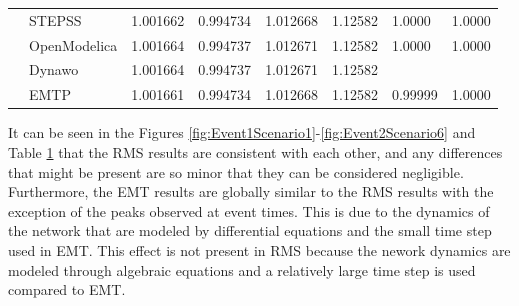 \documentclass{report}
\begin{document}
\begin{table}[H]
\begin{tabular}{ll|l|l|l|l|l|l}
\multicolumn{1}{l|}{\parbox[t]{2mm}{}}  & STEPSS       & 1.001662                                                                          & 0.994734                                                                          & 1.012668                                                                          & 1.12582                                                                           & 1.0000                                                                            & 1.0000                                                                           \\
\multicolumn{1}{l|}{}                              & OpenModelica & 1.001664                                                                          & 0.994737                                                                          & 1.012671                                                                          & 1.12582                                                                           & 1.0000                                                                            & 1.0000                                                                           \\
\multicolumn{1}{l|}{}                              & Dynawo       & 1.001664                                                                          & 0.994737                                                                          & 1.012671                                                                          & 1.12582                                                                           &                                                                                   &                                                                                  \\
\multicolumn{1}{l|}{}                              & EMTP         & 1.001661                                                                          & 0.994734                                                                          & 1.012668                                                                          & 1.12582                                                                           & 0.99999                                                                           & 1.0000                                                                          
\end{tabular}
\label{1VSC_results_table}
\end{table}
It can be seen in the Figures \ref{fig:Event1Scenario1}-\ref{fig:Event2Scenario6} and Table \ref{1VSC_results_table} that the RMS results are consistent with each other, and any differences that might be present are so minor that they can be considered negligible. Furthermore, the EMT results are globally similar to the RMS results with the exception of the peaks observed at event times. This is due to the dynamics of the network that are modeled by differential equations and the small time step used in EMT. This effect is not present in RMS because the nework dynamics are modeled through algebraic equations and a relatively large time step is used compared to EMT.
\end{document}
